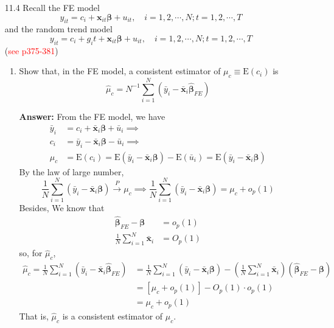 \begin{enumerate}
    \item[11.4] Recall the FE model
    \[ y_{it} = c_i + \mathbf{x}_{it}\bm{\beta} + u_{it},\quad i = 1,2,\cdots,N;t = 1,2,\cdots,T \]
    and the random trend model
    \[ y_{i t}=c_{i}+g_{i} t+\mathbf{x}_{i t} \boldsymbol{\beta}+u_{i t}, \quad i = 1,2,\cdots,N;t = 1,2,\cdots,T \]
    (\textcolor{red}{see p375-381})
    \begin{enumerate}
        \item Show that, in the FE model, a consistent estimator of $\mu_{c} \equiv \mathrm{E}\left(c_{i}\right)$ is 
        \[\hat{\mu}_{c}=N^{-1} \sum_{i=1}^{N}\left(\bar{y}_{i}-\bar{\mathbf{x}}_{i} \hat{\boldsymbol{\beta}}_{F E}\right)\]
        
        \textbf{Answer:} From the FE model, we have
        \begin{align*}
            \bar{y}_i &= c_i + \bar{\mathbf{x}}_i \bm{\beta} + \bar{u}_i \implies \\
            c_i &= \bar{y}_i - \bar{\mathbf{x}}_i \bm{\beta} - \bar{u}_i \implies \\
            \mu_c &= \mathrm{E}(c_i) = \mathrm{E}(\bar{y}_i - \bar{\mathbf{x}}_i \bm{\beta}) - \mathrm{E}(\bar{u}_i) = \mathrm{E}(\bar{y}_i - \bar{\mathbf{x}}_i \bm{\beta})
        \end{align*}
        By the law of large number,
        \[ \frac{1}{N} \sum_{i=1}^{N}\left(\bar{y}_{i}-\bar{\mathbf{x}}_{i} \boldsymbol{\beta}\right) \xrightarrow{P} \mu_c \implies \frac{1}{N} \sum_{i=1}^{N}\left(\bar{y}_{i}-\bar{\mathbf{x}}_{i} \boldsymbol{\beta}\right) = \mu_c + o_p(1) \]
        Besides, We know that 
        \begin{align*}
            \hat{\bm{\beta}}_{FE} - \bm{\beta} &= o_p(1) \\
            \frac{1}{N} \sum_{i=1}^{N} \bar{\mathbf{x}}_{i}&=O_{p}(1)
        \end{align*}
        so, for $\hat{\mu}_c$,
        \begin{align*}
            \hat{\mu}_{c}=\frac{1}{N} \sum_{i=1}^{N}\left(\bar{y}_{i}-\bar{\mathbf{x}}_{i} \hat{\boldsymbol{\beta}}_{F E}\right)&=\frac{1}{N} \sum_{i=1}^{N}\left(\bar{y}_{i}-\bar{\mathbf{x}}_{i} \boldsymbol{\beta}\right)-\left(\frac{1}{N} \sum_{i=1}^{N} \bar{\mathbf{x}}_{i}\right)\left(\hat{\boldsymbol{\beta}}_{F E}-\boldsymbol{\beta}\right) \\
            &= \left[ \mu_c + o_p(1) \right] - O_p(1)\cdot o_p(1) \\
            &= \mu_c + o_p(1)
        \end{align*}
        That is, $\hat{\mu}_c$ is a consistent estimator of $\mu_c$.
        

\end{enumerate}
\end{enumerate}
